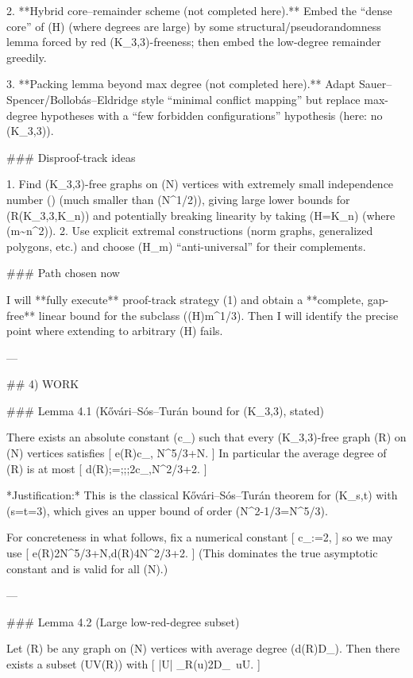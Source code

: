 2. **Hybrid core–remainder scheme (not completed here).**
   Embed the “dense core” of (H) (where degrees are large) by some structural/pseudorandomness lemma forced by red (K_{3,3})-freeness; then embed the low-degree remainder greedily.

3. **Packing lemma beyond max degree (not completed here).**
   Adapt Sauer–Spencer/Bollobás–Eldridge style “minimal conflict mapping” but replace max-degree hypotheses with a “few forbidden configurations” hypothesis (here: no (K_{3,3})).

### Disproof-track ideas

1. Find (K_{3,3})-free graphs on (N) vertices with extremely small independence number (\alpha) (much smaller than (N^{1/2})), giving large lower bounds for (R(K_{3,3},K_n)) and potentially breaking linearity by taking (H=K_n) (where (m\sim n^2)).
2. Use explicit extremal constructions (norm graphs, generalized polygons, etc.) and choose (H_m) “anti-universal” for their complements.

### Path chosen now

I will **fully execute** proof-track strategy (1) and obtain a **complete, gap-free** linear bound for the subclass (\Delta(H)\le m^{1/3}). Then I will identify the precise point where extending to arbitrary (H) fails.

---

## 4) WORK

### Lemma 4.1 (Kővári–Sós–Turán bound for (K_{3,3}), stated)

There exists an absolute constant (c_{}) such that every (K_{3,3})-free graph (R) on (N) vertices satisfies
[
e(R)\le c_{}, N^{5/3}+N.
]
In particular the average degree of (R) is at most
[
\overline d(R);=;;\le;2c_{},N^{2/3}+2.
]

*Justification:* This is the classical Kővári–Sós–Turán theorem for (K_{s,t}) with (s=t=3), which gives an upper bound of order (N^{2-1/3}=N^{5/3}).

For concreteness in what follows, fix a numerical constant
[
c_{}:=2,
]
so we may use
[
e(R)\le 2N^{5/3}+N,\qquad \overline d(R)\le 4N^{2/3}+2.
]
(This dominates the true asymptotic constant and is valid for all (N).)

---

### Lemma 4.2 (Large low-red-degree subset)

Let (R) be any graph on (N) vertices with average degree (\overline d(R)\le D_{}). Then there exists a subset (U\subseteq V(R)) with
[
|U|\ge {}
\qquad{}\qquad
\deg_R(u)\le 2D_{}\ u\in U.
]

